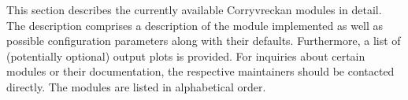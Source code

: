 This section describes the currently available Corryvreckan modules in detail.
The description comprises a description of the module implemented as well as possible configuration parameters along with their defaults.
Furthermore, a list of (potentially optional) output plots is provided.
For inquiries about certain modules or their documentation, the respective maintainers should be contacted directly.
The modules are listed in alphabetical order.
